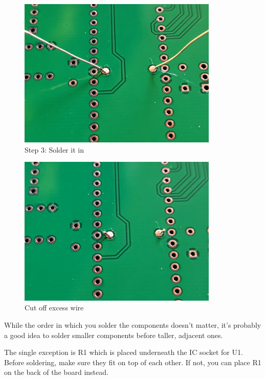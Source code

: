 \documentclass{article}
\newenvironment{caution}{\begin{tcolorbox}[colback=red!5!white,colframe=red!75!black,title=\textbf{Caution}]}{\end{tcolorbox}}
\begin{document}
\begin{figure}[htb]
\centering
\includegraphics[width=0.85\textwidth]{Pictures/Solder3.jpg}
\caption{Step 3: Solder it in}
\label{fig:solder3}
\end{figure}
\begin{figure}[htb]
\centering
\includegraphics[width=0.85\textwidth]{Pictures/Solder4.jpg}
\caption{Cut off excess wire}
\label{fig:solder4}
\end{figure}

While the order in which you solder the components doesn't matter, it's probably a good idea to solder smaller components before taller, adjacent ones. 

\begin{caution}
The single exception is R1 which is placed underneath the IC socket for U1. Before soldering, make sure they fit on top of each other. If not, you can place R1 on the back of the board instead. 
\end{caution}
\end{document}
